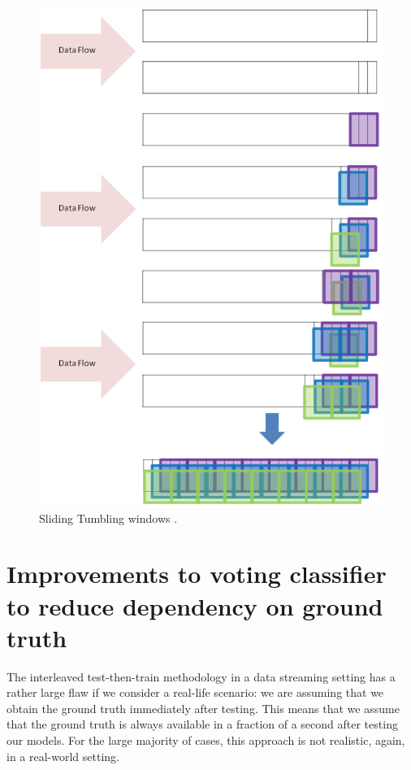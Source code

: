 \begin{figure}
  \includegraphics[width=\linewidth]{./images/sliding_tumbling_windows}
  \caption{Sliding Tumbling windows \citep{d2016fine}.}
  \label{fig:sliding_tumbling_windows}
\end{figure}




\section{Improvements to voting classifier to reduce dependency on ground truth\label{section:vc_reduce_gt}}

The interleaved test-then-train methodology in a data streaming setting has a rather large flaw if we consider a real-life scenario: we are assuming that we obtain the ground truth immediately after testing. This means that we assume that the ground truth is always available in a fraction of a second after testing our models. For the large majority of cases, this approach is not realistic, again, in a real-world setting.

